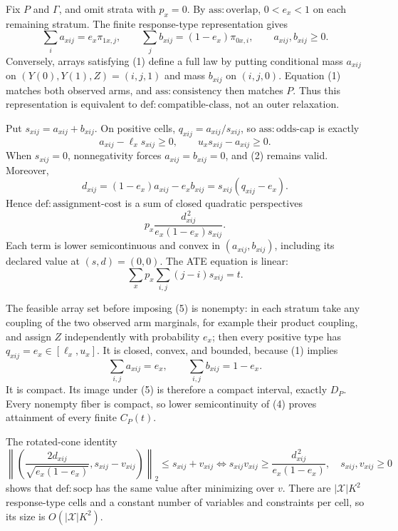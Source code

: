 Fix \(P\) and \(\Gamma\), and omit strata with \(p_x=0\). By \(\mathrm{ass{:}overlap}\), \(0<e_x<1\) on each remaining stratum. The finite response-type representation gives
\[
\sum_i a_{xij}=e_x\pi_{1x,j},\qquad
\sum_j b_{xij}=(1-e_x)\pi_{0x,i},\qquad a_{xij},b_{xij}\geq0. \tag{1}
\]
Conversely, arrays satisfying (1) define a full law by putting conditional mass \(a_{xij}\) on \((Y(0),Y(1),Z)=(i,j,1)\) and mass \(b_{xij}\) on \((i,j,0)\). Equation (1) matches both observed arms, and \(\mathrm{ass{:}consistency}\) then matches \(P\). Thus this representation is equivalent to \(\mathrm{def{:}compatible\mbox{-}class}\), not an outer relaxation.

Put \(s_{xij}=a_{xij}+b_{xij}\). On positive cells, \(q_{xij}=a_{xij}/s_{xij}\), so \(\mathrm{ass{:}odds\mbox{-}cap}\) is exactly
\[
a_{xij}-\ell_xs_{xij}\geq0,\qquad u_xs_{xij}-a_{xij}\geq0. \tag{2}
\]
When \(s_{xij}=0\), nonnegativity forces \(a_{xij}=b_{xij}=0\), and (2) remains valid. Moreover,
\[
d_{xij}=(1-e_x)a_{xij}-e_xb_{xij}=s_{xij}(q_{xij}-e_x). \tag{3}
\]
Hence \(\mathrm{def{:}assignment\mbox{-}cost}\) is a sum of closed quadratic perspectives
\[
p_x\frac{d_{xij}^{\,2}}{e_x(1-e_x)s_{xij}}. \tag{4}
\]
Each term is lower semicontinuous and convex in \((a_{xij},b_{xij})\), including its declared value at \((s,d)=(0,0)\). The ATE equation is linear:
\[
\sum_xp_x\sum_{i,j}(j-i)s_{xij}=t. \tag{5}
\]

The feasible array set before imposing (5) is nonempty: in each stratum take any coupling of the two observed arm marginals, for example their product coupling, and assign \(Z\) independently with probability \(e_x\); then every positive type has \(q_{xij}=e_x\in[\ell_x,u_x]\). It is closed, convex, and bounded, because (1) implies
\[
\sum_{i,j}a_{xij}=e_x,\qquad \sum_{i,j}b_{xij}=1-e_x.
\]
It is compact. Its image under (5) is therefore a compact interval, exactly \(D_P\). Every nonempty fiber is compact, so lower semicontinuity of (4) proves attainment of every finite \(C_P(t)\).

The rotated-cone identity
\[
\left\|\left(\frac{2d_{xij}}{\sqrt{e_x(1-e_x)}},s_{xij}-v_{xij}\right)\right\|_2
\leq s_{xij}+v_{xij}
\Longleftrightarrow
s_{xij}v_{xij}\geq\frac{d_{xij}^{\,2}}{e_x(1-e_x)},\quad s_{xij},v_{xij}\geq0 \tag{6}
\]
shows that \(\mathrm{def{:}socp}\) has the same value after minimizing over \(v\). There are \(|\mathcal X|K^2\) response-type cells and a constant number of variables and constraints per cell, so its size is \(O(|\mathcal X|K^2)\).

